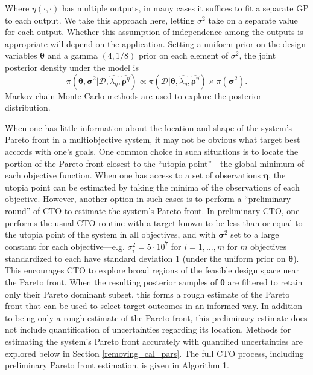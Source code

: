 \documentclass[12pt]{article}
\begin{document}
%
Where $\eta(\cdot,\cdot)$ has multiple outputs, in many cases it suffices to fit a separate GP to each output.
%
We take this approach here, letting $\sigma^2$ take on a separate value for each output.
%
Whether this assumption of independence among the outputs is appropriate will depend on the application.
%
Setting a uniform prior on the design variables $\boldsymbol\theta$ and a gamma $(4,1/8)$ prior on each element of $\sigma^2$, the joint posterior density under the model is
%
\begin{equation} \label{eq:full_dist}
\pi(\boldsymbol \theta,\boldsymbol \sigma^2|\mathcal D,\widehat{\lambda_\eta},\widehat{\boldsymbol \rho^\eta})
\propto \pi(\mathcal D | \boldsymbol \theta,\widehat{\lambda_\eta}, \widehat{\boldsymbol \rho^\eta}) \times \pi(\boldsymbol \sigma^2).
\end{equation}
%
Markov chain Monte Carlo methods are used to explore the posterior distribution.
%

%
When one has little information about the location and shape of the system's Pareto front in a multiobjective system, it may not be obvious what target best accords with one's goals.
%
One common choice in such situations is to locate the portion of the Pareto front closest to the ``utopia point''---the global minimum of each objective function.
%
When one has access to a set of observations $\boldsymbol\eta$, the utopia point can be estimated by taking the minima of the observations of each objective.
%
However, another option in such cases is to perform a ``preliminary round'' of CTO to estimate the system's Pareto front.
%
In preliminary CTO, one performs the usual CTO routine with a target known to be less than or equal to the utopia point of the system in all objectives, and with $\boldsymbol\sigma^2$ set to a large constant for each objective---e.g. $\sigma^2_i =5\cdot10^7$ for $i=1,\ldots,m$ for $m$ objectives standardized to each have standard deviation 1 (under the uniform prior on $\boldsymbol\theta$).
%
This encourages CTO to explore broad regions of the feasible design space near the Pareto front.
%
When the resulting posterior samples of $\boldsymbol\theta$ are filtered to retain only their Pareto dominant subset, this forms a rough estimate of the Pareto front that can be used to select target outcomes in an informed way.
%
In addition to being only a rough estimate of the Pareto front, this preliminary estimate does not include quantification of uncertainties regarding its location.
%
Methods for estimating the system's Pareto front accurately with quantified uncertainties are explored below in Section \ref{removing_cal_pars}.
%
The full CTO process, including preliminary Pareto front estimation, is given in Algorithm 1.
\end{document}
